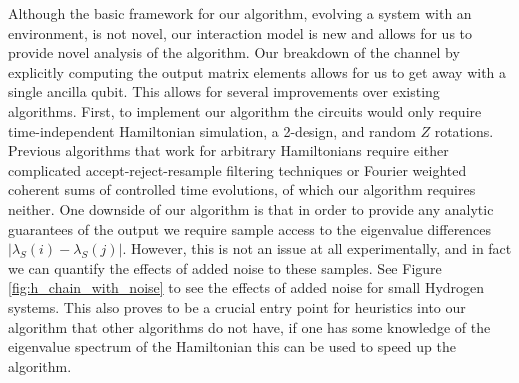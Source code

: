 \documentclass{article}
\begin{document}
Although the basic framework for our algorithm, evolving a system with an environment, is not novel, our interaction model is new and allows for us to provide novel analysis of the algorithm. Our breakdown of the channel by explicitly computing the output matrix elements allows for us to get away with a single ancilla qubit. This allows for several improvements over existing algorithms. First, to implement our algorithm the circuits would only require time-independent Hamiltonian simulation, a 2-design, and random $Z$ rotations. Previous algorithms that work for arbitrary Hamiltonians require either complicated accept-reject-resample filtering techniques or Fourier weighted coherent sums of controlled time evolutions, of which our algorithm requires neither. One downside of our algorithm is that in order to provide any analytic guarantees of the output we require sample access to the eigenvalue differences $|\lambda_S(i) - \lambda_S(j)|$. However, this is not an issue at all experimentally, and in fact we can quantify the effects of added noise to these samples. See Figure \ref{fig:h_chain_with_noise} to see the effects of added noise for small Hydrogen systems. This also proves to be a crucial entry point for heuristics into our algorithm that other algorithms do not have, if one has some knowledge of the eigenvalue spectrum of the Hamiltonian this can be used to speed up the algorithm.
\end{document}
